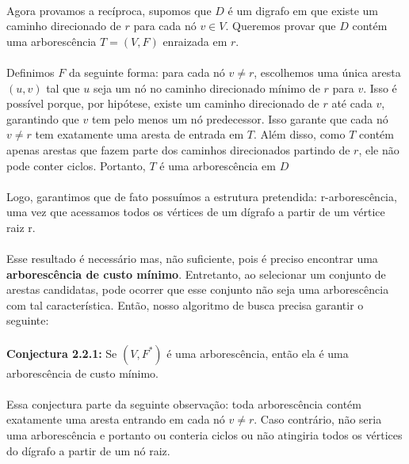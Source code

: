 \documentclass[12pt,a4paper]{article}
\begin{document}
\paragraph{}
Agora provamos a recíproca, supomos que \( D \) é um digrafo em que existe um caminho direcionado de \( r \) para cada nó \( v \in V \). Queremos provar que \( D \) contém uma arborescência \(T = (V, F) \) enraizada em \( r \).

\paragraph{}
Definimos \( F \) da seguinte forma: para cada nó \( v \neq r \), escolhemos uma única aresta \( (u, v) \) tal que \( u \) seja um nó no caminho direcionado mínimo de \( r \) para \( v \). Isso é possível porque, por hipótese, existe um caminho direcionado de \( r \) até cada \( v \), garantindo que \( v \) tem pelo menos um nó predecessor. Isso garante que cada nó \( v \neq r \) tem exatamente uma aresta de entrada em \( T \). Além disso, como \( T \) contém apenas arestas que fazem parte dos caminhos direcionados partindo de \( r \), ele não pode conter ciclos. Portanto, \( T \) é uma arborescência em \( D \)

\paragraph{}
Logo, garantimos que de fato possuímos a estrutura pretendida: r-arborescência, uma vez que acessamos todos os vértices de um dígrafo a partir de um vértice raiz r.

\paragraph{}
Esse resultado é necessário mas, não suficiente, pois é preciso encontrar uma \textbf{arborescência de custo mínimo}. Entretanto, ao selecionar um conjunto de arestas candidatas, pode ocorrer que esse conjunto não seja uma arborescência com tal característica. Então, nosso algoritmo de busca precisa garantir o seguinte:

\paragraph{}
\textbf{Conjectura 2.2.1:} Se \((V, F^*)\) é uma arborescência, então ela é uma arborescência de custo mínimo.

\paragraph{}
Essa conjectura parte da seguinte observação: toda arborescência contém exatamente uma aresta entrando em cada nó \( v \neq r \). Caso contrário, não seria uma arborescência e portanto ou conteria ciclos ou não atingiria todos os vértices do dígrafo a partir de um nó raiz.
\end{document}
